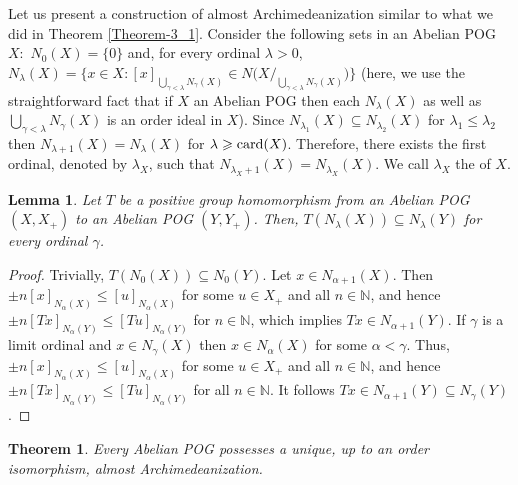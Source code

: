 \documentclass[10pt]{article}
\newtheorem{theorem}{Theorem}[section]
\newtheorem{lemma}{Lemma}[section]
\newcommand{\card}{\hbox{\rm card}}
\renewcommand{\a}{\alpha}
\newcommand{\g}{\gamma}
\begin{document}
Let us present a construction of almost Archimedeanization similar to what we did in Theorem \ref{Theorem-3_1}.
Consider the following sets in an Abelian POG $X$:\ $N_0(X)=\{0\}$ and, for every ordinal $\lambda>0$,  
$N_{\lambda}(X)=\bigl\{x\in X: [x]_{\bigcup_{{\g}<\lambda}N_{{\g}}(X)}\in N\bigl(X/_{\bigcup_{{\g}<\lambda}N_{{\g}}(X)}\bigl)\bigl\}$ 
(here, we use the straightforward fact that if $X$ an Abelian POG then each $N_{\lambda}(X)$ as well as $\bigcup_{{\g}<\lambda}N_{{\g}}(X)$
is an order ideal in $X$). Since $N_{\lambda_1}(X)\subseteq N_{\lambda_2}(X)$ for $\lambda_1\leqslant\lambda_2$ then 
$N_{\lambda+1}(X)=N_{\lambda}(X)$ for $\lambda\geqslant\card(X)$. Therefore, there exists
the first ordinal, denoted by $\lambda_X$, such that $N_{\lambda_X+1}(X)=N_{\lambda_X}(X)$.
We call $\lambda_X$ the {\color{blue}{almost Archimedeanization type}} of $X$.

\begin{lemma}\label{Lemma-5_2}
Let $T$ be a positive group homomorphism from an Abelian POG $(X,X_+)$ to an Abelian POG $(Y,Y_+)$. 
Then, $T(N_{\lambda}(X))\subseteq N_{\lambda}(Y)$ for every ordinal ${\g}$.
\end{lemma}

\begin{proof}
Trivially, $T(N_{0}(X))\subseteq N_{0}(Y)$.
Let $x\in N_{{\a}+1}(X)$. Then $\pm n[x]_{N_{{\a}}(X)}\leqslant [u]_{N_{{\a}}(X)}$ for some $u\in X_+$ and all $n\in\mathbb{N}$, 
and hence $\pm n[Tx]_{N_{{\a}}(Y)}\leqslant [Tu]_{N_{{\a}}(Y)}$ for $n\in\mathbb{N}$, which implies $Tx\in N_{{\a}+1}(Y)$. 
If ${\g}$ is a limit ordinal and $x\in N_{{\g}}(X)$ then $x\in N_{{\a}}(X)$ for some ${\a}<{\g}$. 
Thus, $\pm n[x]_{N_{{\a}}(X)}\leqslant [u]_{N_{{\a}}(X)}$ for some $u\in X_+$ and all $n\in\mathbb{N}$, and hence
$\pm n[Tx]_{N_{{\a}}(Y)}\leqslant [Tu]_{N_{{\a}}(Y)}$ for all $n\in\mathbb{N}$. It follows $Tx\in N_{{\a}+1}(Y)\subseteq N_{{\g}}(Y)$.
\end{proof}

\begin{theorem}\label{Theorem-5_1}
Every Abelian POG possesses a unique, up to an order isomorphism, almost Archime\-deanization.
\end{theorem}
 
\end{document}
